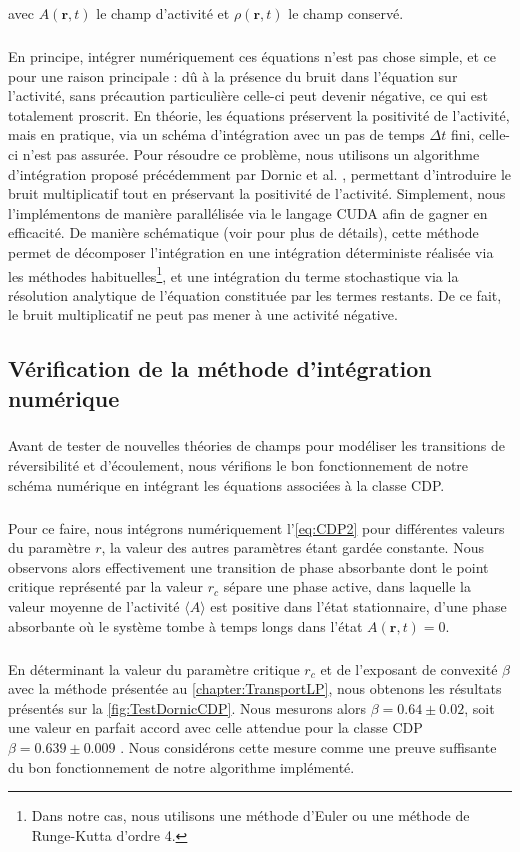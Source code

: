 \noindent avec $A(\mathbf{r}, t)$ le champ d'activité et $\rho (\mathbf{r}, t)$ le champ conservé.

\subparagraph{}En principe, intégrer numériquement ces équations n'est pas chose simple, et ce pour une raison principale : dû à la présence du bruit dans l'équation sur l'activité, sans précaution particulière celle-ci peut devenir négative, ce qui est totalement proscrit. En théorie, les équations préservent la positivité de l'activité, mais en pratique, via un schéma d'intégration avec un pas de temps $\Delta t$ fini, celle-ci n'est pas assurée. Pour résoudre ce problème, nous utilisons un algorithme d'intégration proposé précédemment par Dornic et al. \cite{dornic_integration_2005}, permettant d'introduire le bruit multiplicatif tout en préservant la positivité de l'activité. Simplement, nous l'implémentons de manière parallélisée via le langage CUDA afin de gagner en efficacité. De manière schématique (voir \cite{dornic_integration_2005} pour plus de détails), cette méthode permet de décomposer l'intégration en une intégration déterministe réalisée via les méthodes habituelles\footnote{Dans notre cas, nous utilisons une méthode d'Euler ou une méthode de Runge-Kutta d'ordre 4.}, et une intégration du terme stochastique via la résolution analytique de l'équation constituée par les termes restants. De ce fait, le bruit multiplicatif ne peut pas mener à une activité négative.

\subsection{Vérification de la méthode d'intégration numérique}

\subparagraph{}Avant de tester de nouvelles théories de champs pour modéliser les transitions de réversibilité et d'écoulement, nous vérifions le bon fonctionnement de notre schéma numérique en intégrant les équations associées à la classe CDP.

\subparagraph{}Pour ce faire, nous intégrons numériquement l'\autoref{eq:CDP2} pour différentes valeurs du paramètre $r$, la valeur des autres paramètres étant gardée constante. Nous observons alors effectivement une transition de phase absorbante dont le point critique représenté par la valeur $r_c$ sépare une phase active, dans laquelle la valeur moyenne de l'activité $\langle A \rangle$ est positive dans l'état stationnaire, d'une phase absorbante où le système tombe à temps longs dans l'état $A(\mathbf{r}, t) = 0$.

\subparagraph{}En déterminant la valeur du paramètre critique $r_c$ et de l'exposant de convexité $\beta$ avec la méthode présentée au \autoref{chapter:TransportLP}, nous obtenons les résultats présentés sur la \autoref{fig:TestDornicCDP}. Nous mesurons alors $\beta = 0.64 \pm 0.02$, soit une valeur en parfait accord avec celle attendue pour la classe CDP $\beta = 0.639 \pm 0.009$ \cite{lubeck_universal_2004}. Nous considérons cette mesure comme une preuve suffisante du bon fonctionnement de notre algorithme implémenté.

